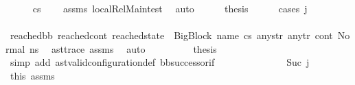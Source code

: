 \begin{isabellebody}
\ \ \ \ \isamarkupfalse%
\ {\isachardoublequoteopen}cs{}\ {\isasymnoteq}\ {\isacharbrackleft}{\kern0pt}{\isacharbrackright}{\kern0pt}{\isachardoublequoteclose}\ \isamarkupfalse%
\ assms{\isacharparenleft}{\kern0pt}{}{\isacharparenright}{\kern0pt}\ local{\isachardot}{\kern0pt}Rel{\isacharunderscore}{\kern0pt}Main{\isacharunderscore}{\kern0pt}test\ \isamarkupfalse%
\ auto\isanewline
\ \ \ \ \isamarkupfalse%
\ {\isacharquery}{\kern0pt}thesis\isanewline
\ \ \ \ \isamarkupfalse%
\ {\isacharparenleft}{\kern0pt}cases\ j{\isacharparenright}{\kern0pt}\isanewline
\ \ \ \ \ \ \isamarkupfalse%
\ {}\isanewline
\ \ \ \ \ \ \isamarkupfalse%
\ {\isachardoublequoteopen}{\isacharparenleft}{\kern0pt}reached{\isacharunderscore}{\kern0pt}bb{\isacharcomma}{\kern0pt}\ reached{\isacharunderscore}{\kern0pt}cont{\isacharcomma}{\kern0pt}\ reached{\isacharunderscore}{\kern0pt}state{\isacharparenright}{\kern0pt}\ {\isacharequal}{\kern0pt}\ {\isacharparenleft}{\kern0pt}{\isacharparenleft}{\kern0pt}BigBlock\ name\ cs{}\ any{\isacharunderscore}{\kern0pt}str\ any{\isacharunderscore}{\kern0pt}tr{\isacharparenright}{\kern0pt}{\isacharcomma}{\kern0pt}\ cont{}{\isacharcomma}{\kern0pt}\ {\isacharparenleft}{\kern0pt}Normal\ ns{}{\isacharparenright}{\kern0pt}{\isacharparenright}{\kern0pt}{\isachardoublequoteclose}\ \isamarkupfalse%
\ ast{\isacharunderscore}{\kern0pt}trace\ assms{\isacharparenleft}{\kern0pt}{}{\isacharparenright}{\kern0pt}\ \isamarkupfalse%
\ auto\isanewline
\ \ \ \ \ \ \isamarkupfalse%
\ \isamarkupfalse%
\ {\isacharquery}{\kern0pt}thesis\ \isamarkupfalse%
\ {\isacharparenleft}{\kern0pt}simp\ add{\isacharcolon}{\kern0pt}\ ast{\isacharunderscore}{\kern0pt}valid{\isacharunderscore}{\kern0pt}configuration{\isacharunderscore}{\kern0pt}def\ bb{\isacharunderscore}{\kern0pt}successor{\isacharunderscore}{\kern0pt}if{\isacharparenright}{\kern0pt}\ \isanewline
\ \ \ \ \isamarkupfalse%
\isanewline
\ \ \ \ \ \ \isamarkupfalse%
\ {}{\isacharcolon}{\kern0pt}\ {\isacharparenleft}{\kern0pt}Suc\ j{\isacharprime}{\kern0pt}{\isacharparenright}{\kern0pt}\isanewline
\ \ \ \ \ \ \isamarkupfalse%
\ this\ assms{\isacharparenleft}{\kern0pt}{}{\isacharparenright}{\kern0pt}\ \isamarkupfalse%

\end{isabellebody}
